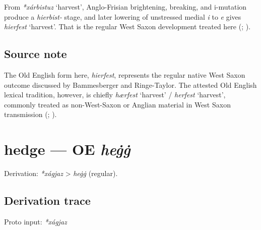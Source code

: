 \documentclass[
  british,
  a4paper,
  openany]{book}
\providecommand{\Recon}[1]{\emph{*#1}}
{\catcode`→=\active \global\def→{\ensuremath{\rightarrow}}}
\providecommand{\texorpdfstring}[2]{#1}
\providecommand{\Recon}[1]{\emph{*#1}}
{\catcode`→=\active \global\def→{\ensuremath{\rightarrow}}}
\begin{document}
From \Recon{xárbistuz} `harvest', Anglo-Frisian brightening, breaking,
and i-mutation produce a \emph{hierbist-} stage, and later lowering of
unstressed medial \emph{i} to \emph{e} gives \emph{hierfest} `harvest'.
That is the regular West Saxon development treated here
(;
).

\subsection{Source note}\label{source-note-2}

The Old English form here, \emph{hierfest}, represents the regular
native West Saxon outcome discussed by Bammesberger and Ringe-Taylor.
The attested Old English lexical tradition, however, is chiefly
\emph{hærfest} `harvest' / \emph{herfest} `harvest', commonly treated as
non-West-Saxon or Anglian material in West Saxon transmission
(;
).

\section{\texorpdfstring{hedge --- OE
\emph{heġġ}}{hedge --- OE heġġ}}\label{hedge-oe-heux121ux121}


Derivation: \emph{*xágjaz} \textgreater{} \emph{heġġ} (regular).

\subsection{Derivation trace}\label{derivation-trace-27}

Proto input: \emph{*xágjaz}

\begingroup
\setlength{\fboxsep}{6pt}
\end{document}
